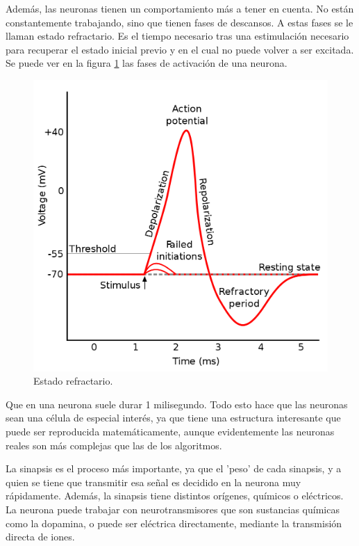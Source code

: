 \documentclass[12pt]{book}
\numberwithin{equation}{section}
\begin{document}
Además, las neuronas tienen un comportamiento más a tener en cuenta. No están constantemente trabajando, sino que tienen fases de descansos. A estas fases se le llaman estado refractario. Es el tiempo necesario tras una estimulación necesario para recuperar el estado inicial previo y en el cual no puede volver a ser excitada. Se puede ver en la figura \ref{fig:refractario} las fases de activación de una neurona.
\begin{figure}[h]
    \centering
    \includegraphics[scale=0.2]{refractorystate.png}
    \caption{Estado refractario.}
    \label{fig:refractario}
\end{figure}

Que en una neurona suele durar 1 milisegundo. Todo esto hace que las neuronas sean una célula de especial interés, ya que tiene una estructura interesante que puede ser reproducida matemáticamente, aunque evidentemente las neuronas reales son más complejas que las de los algoritmos.

La sinapsis es el proceso más importante, ya que el 'peso' de cada sinapsis, y a quien se tiene que transmitir esa señal es decidido en la neurona muy rápidamente. Además, la sinapsis tiene distintos orígenes, químicos o eléctricos. La neurona puede trabajar con neurotransmisores que son sustancias químicas como la dopamina, o puede ser eléctrica directamente, mediante la transmisión directa de iones.	
\end{document}
